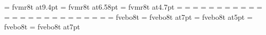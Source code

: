 \font\tentt=        fvmr8t at9.4pt%
\def\ninett{\font\fzzozznzzt=       fvmr8t at8.46pt \fzzozznzzt}%
\def\eighttt{\font\fzzozznzzt=      fvmr8t at7.52pt \fzzozznzzt}%
\font\seventt=      fvmr8t at6.58pt
\def\sixtt{\font\fzzozznzzt=        fvmr8t at5.64pt \fzzozznzzt}%
\font\fivett=       fvmr8t at4.7pt
%
=\tenrm
{}=\sevenrm
{}=\fiverm
\def\rm{\fam=0 \tenrm}%
%
=\eleveni
{}=\eighti
{}=\sixi
\def\mit{\fam=1}%
%
=\elevensy
{}=\eightsy
{}=\sixsy
\def\cal{\fam=2}%
%
=\elevenex
{}=\eightex
{}=\sixex
%
\def\it{\fam=\itfam \tenit}%
\textfont\itfam=\tenit
\scriptfont\itfam=\sevenit
\scriptscriptfont\itfam=\fiveit
%
\def\sl{\fam=\slfam \tensl}%
\textfont\slfam=\tensl
\scriptfont\slfam=\sevensl
\scriptscriptfont\slfam=\fivesl
%
\def\bf{\fam=\bffam \tenbf}%
\textfont\bffam=\tenbf
\scriptfont\bffam=\sevenbf
\scriptscriptfont\bffam=\fivebf
%
\def\tt{\fam=\ttfam \tentt}%
\textfont\ttfam=\tentt
\scriptfont\ttfam=\seventt
\scriptscriptfont\ttfam=\fivett
%
\def\twentyitbf{\font\fzzozznzzt=   fvebo8t at20pt \fzzozznzzt}%
\def\eighteenitbf{\font\fzzozznzzt= fvebo8t at18pt \fzzozznzzt}%
\def\sixteenitbf{\font\fzzozznzzt=  fvebo8t at16pt \fzzozznzzt}%
\def\fourteenitbf{\font\fzzozznzzt=    fvebo8t at14pt \fzzozznzzt}%
\def\twelveitbf{\font\fzzozznzzt=   fvebo8t at12pt \fzzozznzzt}%
\font\itbf=            fvebo8t
\def\nineitbf{\font\fzzozznzzt=        fvebo8t at9pt \fzzozznzzt}%
\def\eightitbf{\font\fzzozznzzt=       fvebo8t at8pt \fzzozznzzt}%
\font\sevenitbf=       fvebo8t at7pt
\def\sixitbf{\font\fzzozznzzt=         fvebo8t at6pt \fzzozznzzt}%
\font\fiveitbf=        fvebo8t at5pt
%
\def\twentyslbf{\font\fzzozznzzt=   fvebo8t at20pt \fzzozznzzt}%
\def\eighteenslbf{\font\fzzozznzzt= fvebo8t at18pt \fzzozznzzt}%
\def\sixteenslbf{\font\fzzozznzzt=  fvebo8t at16pt \fzzozznzzt}%
\def\fourteenslbf{\font\fzzozznzzt=    fvebo8t at14pt \fzzozznzzt}%
\def\twelveslbf{\font\fzzozznzzt=   fvebo8t at12pt \fzzozznzzt}%
\font\slbf=            fvebo8t
\def\nineslbf{\font\fzzozznzzt=        fvebo8t at9pt \fzzozznzzt}%
\def\eightslbf{\font\fzzozznzzt=       fvebo8t at8pt \fzzozznzzt}%
\font\sevenslbf=       fvebo8t at7pt
\def\sixslbf{\font\fzzozznzzt=         fvebo8t at6pt \fzzozznzzt}%

